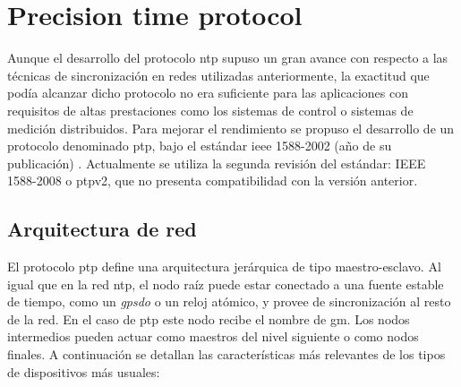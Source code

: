 \section{Precision time protocol}

Aunque el desarrollo del protocolo \gls{ntp} supuso un gran avance con respecto 
a las técnicas de sincronización en redes utilizadas anteriormente, la 
exactitud que podía alcanzar dicho protocolo no era suficiente para las 
aplicaciones con requisitos de altas prestaciones como los sistemas de control 
o sistemas de medición distribuidos. Para mejorar el rendimiento se propuso el 
desarrollo de un protocolo denominado \acrlong{ptp}, bajo el estándar 
\acrshort{ieee} 1588-2002 (año de su publicación) \cite{IEEE1588_2008}. 
Actualmente se utiliza la segunda revisión del estándar: IEEE 1588-2008 o 
\gls{ptp}v2, que no presenta compatibilidad con la versión anterior.

\subsection{Arquitectura de red}

El protocolo \gls{ptp} define una arquitectura jerárquica de tipo 
maestro-esclavo. Al igual que en la red \gls{ntp}, el nodo raíz puede estar 
conectado a una fuente estable de tiempo, como un \textit{\gls{gpsdo}} o un 
reloj 
atómico, y provee de sincronización al resto de la red. En el caso de \gls{ptp} 
este nodo recibe el nombre de \acrlong{gm}. Los nodos intermedios pueden actuar 
como maestros del nivel siguiente o como nodos finales. A continuación se 
detallan las características más relevantes de los tipos de dispositivos más 
usuales:

